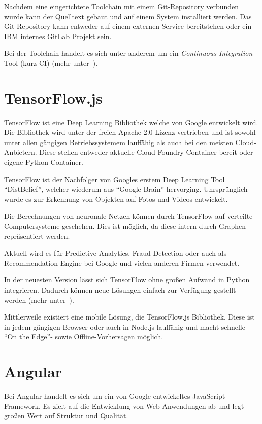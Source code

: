 Nachdem eine eingerichtete Toolchain mit einem Git-Repository verbunden wurde kann der Quelltext gebaut und auf einem
System installiert werden. Das Git-Repository kann entweder auf einem externen Service bereitstehen oder ein IBM internes
GitLab Projekt sein.

Bei der Toolchain handelt es sich unter anderem um ein \textit{Continuous Integration}-Tool (kurz CI)
(mehr unter~\cite{online_grundlagen_toolchain}).

\section{TensorFlow.js}
TensorFlow ist eine Deep Learning Bibliothek welche von Google entwickelt wird. Die Bibliothek wird unter der freien
Apache 2.0 Lizenz vertrieben und ist sowohl unter allen gängigen Betriebssystemem lauffähig als auch bei den meisten
Cloud-Anbietern. Diese stellen entweder aktuelle Cloud Foundry-Container bereit oder eigene Python-Container.

TensorFlow ist der Nachfolger von Googles erstem Deep Learning Tool \enquote{DistBelief}, welcher wiederum aus
\enquote{Google Brain} hervorging. Uhrsprünglich wurde es zur Erkennung von Objekten auf Fotos und Videos entwickelt.

Die Berechnungen von neuronale Netzen können durch TensorFlow auf verteilte Computersysteme geschehen. Dies ist möglich,
da diese intern durch Graphen repräsentiert werden.

Aktuell wird es für Predictive Analytics, Fraud Detection oder auch als Recommendation Engine bei Google und vielen
anderen Firmen verwendet.

In der neuesten Version lässt sich TensorFlow ohne großen Aufwand in Python integrieren. Dadurch können neue Lösungen
einfach zur Verfügung gestellt werden (mehr unter~\cite{book_grundlagen_tensorflow}).

Mittlerweile existiert eine mobile Lösung, die TensorFlow.js Bibliothek. Diese ist in jedem gängigen Browser oder auch
in Node.js lauffähig und macht schnelle \enquote{On the Edge}- sowie Offline-Vorhersagen möglich.

\section{Angular}
Bei Angular handelt es sich um ein von Google entwickeltes JavaScript-Framework. Es zielt auf die Entwicklung von
Web-Anwendungen ab und legt großen Wert auf Struktur und Qualität.

